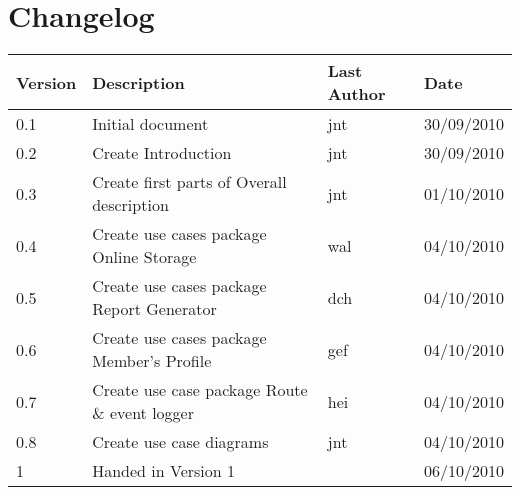 \section*{Changelog}

\begin{table}[h!]
	\begin{center}
		\begin{tabular}{|l|l|l|l|}
			\hline
			\rowcolor{fontys_pink_light}Version	&Description	&Last Author	&Date\\
			\hline
			0.1	&Initial document	&jnt	&30/09/2010\\
			\hline
			0.2	&Create Introduction	&jnt	&30/09/2010\\
			\hline
			0.3	&Create first parts of Overall description	&jnt	&01/10/2010\\
			\hline
			0.4	&Create use cases package Online Storage&wal	&04/10/2010\\
			\hline
			0.5	&Create use cases package Report Generator	&dch	&04/10/2010\\
			\hline
			0.6	&Create use cases package Member's Profile	&gef	&04/10/2010\\
			\hline
			0.7	&Create use case package Route \& event logger	&hei	&04/10/2010\\
			\hline
			0.8	&Create use case diagrams	&jnt	&04/10/2010\\
			\hline
			\rowcolor{fontysgreen2}1	& Handed in Version 1 & &06/10/2010\\

		\hline
		\end{tabular}
	\end{center}
	\label{tab:changelog}
\end{table}
